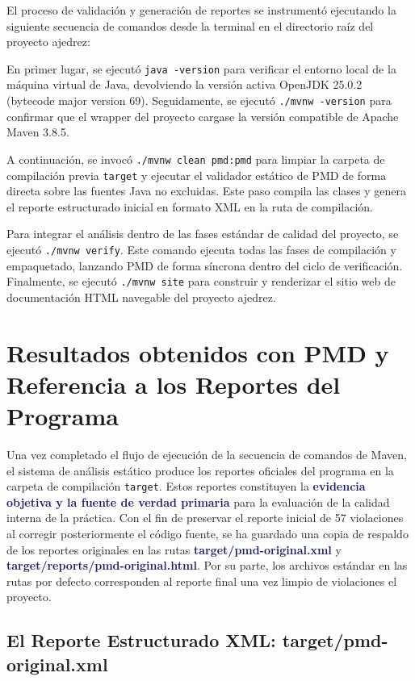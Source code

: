 \documentclass[12pt,a4paper]{article}
\newcommand{\key}[1]{\textbf{\textcolor{MidnightBlue}{#1}}}
\begin{document}
El proceso de validación y generación de reportes se instrumentó ejecutando la siguiente secuencia de comandos desde la terminal en el directorio raíz del proyecto ajedrez:

En primer lugar, se ejecutó \texttt{java -version} para verificar el entorno local de la máquina virtual de Java, devolviendo la versión activa OpenJDK 25.0.2 (bytecode major version 69). Seguidamente, se ejecutó \texttt{./mvnw -version} para confirmar que el wrapper del proyecto cargase la versión compatible de Apache Maven 3.8.5.

A continuación, se invocó \texttt{./mvnw clean pmd:pmd} para limpiar la carpeta de compilación previa \texttt{target} y ejecutar el validador estático de PMD de forma directa sobre las fuentes Java no excluidas. Este paso compila las clases y genera el reporte estructurado inicial en formato XML en la ruta de compilación.

Para integrar el análisis dentro de las fases estándar de calidad del proyecto, se ejecutó \texttt{./mvnw verify}. Este comando ejecuta todas las fases de compilación y empaquetado, lanzando PMD de forma síncrona dentro del ciclo de verificación. Finalmente, se ejecutó \texttt{./mvnw site} para construir y renderizar el sitio web de documentación HTML navegable del proyecto ajedrez.

\section{Resultados obtenidos con PMD y Referencia a los Reportes del Programa}

Una vez completado el flujo de ejecución de la secuencia de comandos de Maven, el sistema de análisis estático produce los reportes oficiales del programa en la carpeta de compilación \texttt{target}. Estos reportes constituyen la \key{evidencia objetiva y la fuente de verdad primaria} para la evaluación de la calidad interna de la práctica. Con el fin de preservar el reporte inicial de 57 violaciones al corregir posteriormente el código fuente, se ha guardado una copia de respaldo de los reportes originales en las rutas \key{target/pmd-original.xml} y \key{target/reports/pmd-original.html}. Por su parte, los archivos estándar en las rutas por defecto corresponden al reporte final una vez limpio de violaciones el proyecto.

\subsection{El Reporte Estructurado XML: target/pmd-original.xml}
\end{document}
